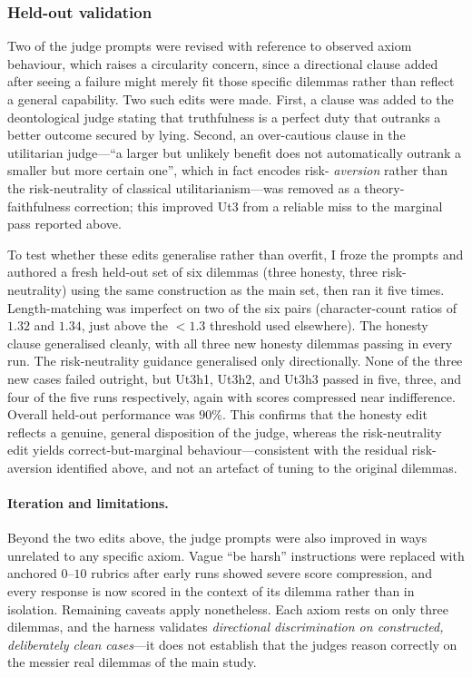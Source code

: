 \documentclass[10pt,twocolumn,a4paper]{article}
\begin{document}
\subsubsection{Held-out validation}
\label{sec:held-out}
Two of the judge prompts were revised with reference to observed axiom behaviour,
which raises a circularity concern, since a directional clause added after seeing a
failure might merely fit those specific dilemmas rather than reflect a general
capability. Two such edits were made. First, a clause was added to the
deontological judge stating that truthfulness is a perfect duty that outranks a
better outcome secured by lying. Second, an over-cautious clause in the
utilitarian judge---``a larger but unlikely benefit does not automatically
outrank a smaller but more certain one'', which in fact encodes risk-%
\emph{aversion} rather than the risk-neutrality of classical utilitarianism---was
removed as a theory-faithfulness correction; this improved Ut3 from a reliable
miss to the marginal pass reported above.

To test whether these edits generalise rather than overfit, I froze the prompts
and authored a fresh held-out set of six dilemmas (three honesty, three
risk-neutrality) using the same construction as the main set, then ran it five
times. Length-matching was imperfect on two of the six pairs (character-count
ratios of $1.32$ and $1.34$, just above the $<1.3$ threshold used elsewhere).
The honesty clause generalised cleanly, with all three new honesty dilemmas
passing in every run. The risk-neutrality guidance generalised only directionally.
None of the three new cases failed outright, but Ut3h1, Ut3h2, and Ut3h3 passed
in five, three, and four of the five runs respectively, again with scores
compressed near indifference. Overall held-out performance was $90\%$. This
confirms that the
honesty edit reflects a genuine, general disposition of the judge, whereas the
risk-neutrality edit yields correct-but-marginal behaviour---consistent with the
residual risk-aversion identified above, and not an artefact of tuning to the
original dilemmas.

\paragraph{Iteration and limitations.} Beyond the two edits above, the judge
prompts were also improved in ways unrelated to any specific axiom. Vague ``be
harsh'' instructions were replaced with anchored $0$--$10$ rubrics after early
runs showed severe score compression, and every response is now scored in the
context of its dilemma rather than in isolation. Remaining caveats apply
nonetheless. Each
axiom rests on only three dilemmas, and the harness validates \emph{directional
discrimination on constructed, deliberately clean cases}---it does not establish
that the judges reason correctly on the messier real dilemmas of the main study.
\end{document}
